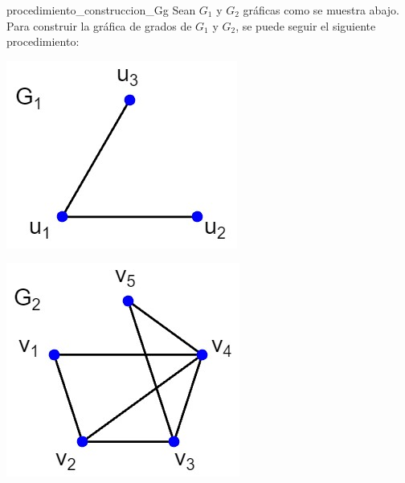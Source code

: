 \documentclass[fleqn, 11pt]{article}
\begin{document}
    \begin{ejemplo}[breakable, pad at break = 4mm, beforeafter skip = 3mm]{}{procedimiento_construccion_Gg}
        Sean $ G_1 $ y $ G_2 $ gráficas como se muestra abajo. Para construir la gráfica de grados de $ G_1 $ y $ G_2 $, se puede seguir el siguiente procedimiento: \vspace{3mm}

        \begin{center}
            \begin{minipage}[h]{0.3\linewidth}
                \includegraphics[width=0.9\linewidth]{Ejemplo_1/Ejemplo1_G1.jpg}
            \end{minipage} \hspace{0.1\linewidth}
            \begin{minipage}[h]{0.3\linewidth}
                \includegraphics[width=0.9\linewidth]{Ejemplo_1/Ejemplo1_G2.jpg}
            \end{minipage}
        \end{center} \vspace{3mm}


\end{ejemplo}
\end{document}
